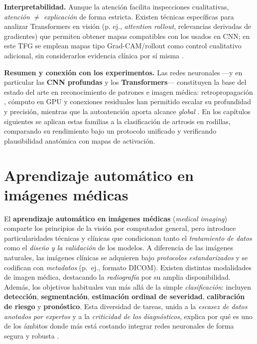 \documentclass[11pt,spanish,listoffigures,listoftables]{tfgetsinf}
\begin{document}
\medskip
\noindent \textbf{Interpretabilidad.} Aunque la atención facilita inspecciones cualitativas, \textit{atención} $\neq$ \textit{explicación} de forma estricta. Existen técnicas específicas para analizar Transformers en visión (p. ej., \textit{attention rollout}, relevancias derivadas de gradientes) que permiten obtener mapas compatibles con los usados en CNN; en este TFG se emplean mapas tipo Grad-CAM/rollout como control cualitativo adicional, sin considerarlos evidencia clínica por sí misma \cite{Chefer2021}. 

\medskip
\noindent \textbf{Resumen y conexión con los experimentos.} Las redes neuronales —y en particular las \textbf{CNN profundas} y los \textbf{Transformers}— constituyen la base del estado del arte en reconocimiento de patrones e imagen médica: retropropagación \cite{Rumelhart1986}, cómputo en GPU \cite{Krizhevsky2012} y conexiones residuales \cite{He2016} han permitido escalar su profundidad y precisión, mientras que la autoatención aporta alcance \textit{global} \cite{Dosovitskiy2021,Touvron2021,Liu2021Swin}. En los capítulos siguientes se aplican estas familias a la clasificación de artrosis en rodillas, comparando su rendimiento bajo un protocolo unificado y verificando plausibilidad anatómica con mapas de activación.


\section{Aprendizaje automático en imágenes médicas}\label{sec:ml-en-imagenes-medicas}

El \textbf{aprendizaje automático en imágenes médicas} (\emph{medical imaging}) comparte los principios de la visión por computador general, pero introduce particularidades técnicas y clínicas que condicionan tanto el \emph{tratamiento de datos} como el \emph{diseño y la validación} de los modelos. A diferencia de las imágenes naturales, las imágenes clínicas se adquieren bajo \emph{protocolos estandarizados} y se codifican con \emph{metadatos} (p.~ej., formato DICOM). Existen distintas modalidades de imagen médica, destacando la \emph{radiografía} por su amplia disponibilidad. Además, los objetivos habituales van más allá de la simple \emph{clasificación}: incluyen \textbf{detección}, \textbf{segmentación}, \textbf{estimación ordinal de severidad}, \textbf{calibración de riesgo} y \textbf{pronóstico}. Esta diversidad de tareas, unida a la \emph{escasez de datos anotados por expertos} y a la \emph{criticidad de los diagnósticos}, explica por qué es uno de los ámbitos donde más está costando integrar redes neuronales de forma segura y robusta \cite{liu_meta_analysis}.
\end{document}
